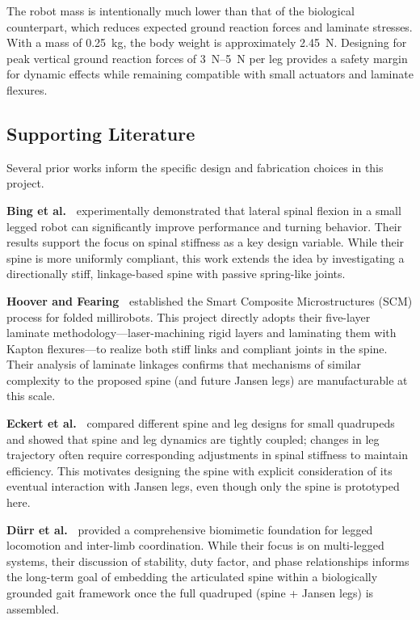 \documentclass[11pt,letterpaper]{article}
\begin{document}
The robot mass is intentionally much lower than that of the biological
counterpart, which reduces expected ground reaction forces and laminate
stresses. With a mass of \SI{0.25}{kg}, the body weight is approximately
\SI{2.45}{N}. Designing for peak vertical ground reaction forces of
\SIrange{3}{5}{N} per leg provides a safety margin for dynamic effects while
remaining compatible with small actuators and laminate flexures.

\subsection{Supporting Literature}

Several prior works inform the specific design and fabrication choices in this project.

\textbf{Bing et al.~\cite{bing}} experimentally demonstrated that lateral spinal flexion in a small legged robot can significantly improve performance and turning behavior. Their results support the focus on spinal stiffness as a key design variable. While their spine is more uniformly compliant, this work extends the idea by investigating a directionally stiff, linkage-based spine with passive spring-like joints.

\textbf{Hoover and Fearing~\cite{hoover_fearing}} established the Smart Composite Microstructures (SCM) process for folded millirobots. This project directly adopts their five-layer laminate methodology---laser-machining rigid layers and laminating them with Kapton flexures---to realize both stiff links and compliant joints in the spine. Their analysis of laminate linkages confirms that mechanisms of similar complexity to the proposed spine (and future Jansen legs) are manufacturable at this scale.

\textbf{Eckert et al.~\cite{eckert}} compared different spine and leg designs for small quadrupeds and showed that spine and leg dynamics are tightly coupled; changes in leg trajectory often require corresponding adjustments in spinal stiffness to maintain efficiency. This motivates designing the spine with explicit consideration of its eventual interaction with Jansen legs, even though only the spine is prototyped here.

\textbf{D\"urr et al.~\cite{duerr}} provided a comprehensive biomimetic foundation for legged locomotion and inter-limb coordination. While their focus is on multi-legged systems, their discussion of stability, duty factor, and phase relationships informs the long-term goal of embedding the articulated spine within a biologically grounded gait framework once the full quadruped (spine + Jansen legs) is assembled.
\end{document}
